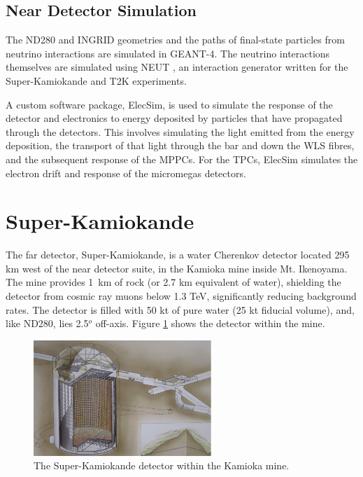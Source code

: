 \subsection{Near Detector Simulation}\label{sec:ndsim}

The ND280 and INGRID geometries and the paths of final-state particles from neutrino interactions are simulated in GEANT-4. The neutrino interactions themselves are simulated using NEUT \cite{neut}, an interaction generator written for the Super-Kamiokande and T2K experiments.

A custom software package, ElecSim, is used to simulate the response of the detector and electronics to energy deposited by particles that have propagated through the detectors. This involves simulating the light emitted from the energy deposition, the transport of that light through the bar and down the WLS fibres, and the subsequent response of the MPPCs. For the TPCs, ElecSim simulates the electron drift and response of the micromegas detectors. 

\section{Super-Kamiokande}\label{sec:SK}

The far detector, Super-Kamiokande, is a water Cherenkov detector located 295 km west of the near detector suite, in the Kamioka mine inside Mt. Ikenoyama. The mine provides 1~km of rock (or 2.7 km equivalent of water), shielding the detector from cosmic ray muons below 1.3 TeV, significantly reducing background rates. The detector is filled with 50 kt of pure water (25 kt fiducial volume), and, like ND280, lies 2.5$^o$ off-axis. Figure \ref{fig:superk} shows the detector within the mine.

\begin{figure}[!htbp]
\centering
\includegraphics*[width=0.6\textwidth,clip]{figs/Superk}
\caption{The Super-Kamiokande detector within the Kamioka mine.}\label{fig:superk}
\end{figure}

